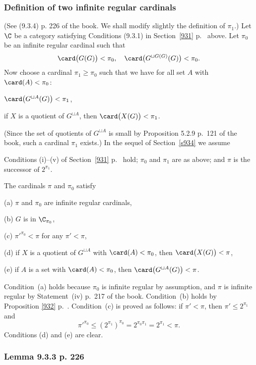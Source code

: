 \documentclass[12pt]{article}
\theoremstyle{remark}
\theoremstyle{definition}
\begin{document}

\subsubsection{Definition of two infinite regular cardinals}

(See (9.3.4) p. 226 of the book. We shall modify slightly the definition of $\pi_1$.) Let $\C$ be a category satisfying Conditions (9.3.1) in Section~\ref{931} p.~ above. Let $\pi_0$ be an infinite regular cardinal such that 
$$
\card\big(G(G)\big)<\pi_0,\quad\card\big(G^{\sqcup G(G)}(G)\big)<\pi_0.
$$ 
Now choose a cardinal $\pi_1\ge\pi_0$ such that we have for all set $A$ with $\card(A)<\pi_0$: 

$\card\big(G^{\sqcup A}(G)\big)<\pi_1$, 

if $X$ is a quotient of $G^{\sqcup A}$, then $\card\big(X(G)\big)<\pi_1$. 

\nn(Since the set of quotients of $G^{\sqcup A}$ is small by Proposition 5.2.9 p.~121 of the book, such a cardinal $\pi_1$ exists.) In the sequel of Section~\ref{s934} we assume 

\begin{cond}
Conditions (i)--(v) of Section~\ref{931} p.~ hold; $\pi_0$ and $\pi_1$ are as above; and $\pi$ is the successor of $2^{\pi_1}$.
\end{cond}

\nn The cardinals $\pi$ and $\pi_0$ satisfy 

(a) $\pi$ and $\pi_0$ are infinite regular cardinals,

(b) $G$ is in $\C_{\pi_0}$,

(c) $\pi'^{\pi_0}<\pi$ for any $\pi'<\pi$, 

(d) if $X$ is a quotient of $G^{\sqcup A}$ with $\card(A)<\pi_0$, then $\card\big(X(G)\big)<\pi$, 

(e) if $A$ is a set with $\card(A)<\pi_0$, then $\card\big(G^{\sqcup A}(G)\big)<\pi$.

\nn Condition~(a) holds because $\pi_0$ is infinite regular by assumption, and $\pi$ is infinite regular by Statement~(iv) p.~217 of the book. Condition~(b) holds by Proposition \ref{932} p.~. Condition~(c) is proved as follows: if $\pi'<\pi$, then $\pi'\le2^{\pi_1}$ and 
$$
\pi'^{\pi_0}\le(2^{\pi_1})^{\pi_0}=2^{\pi_0\pi_1}=2^{\pi_1}<\pi.
$$ 
Conditions (d) and (e) are clear. 

\subsubsection{Lemma 9.3.3 p. 226}
\end{document}
